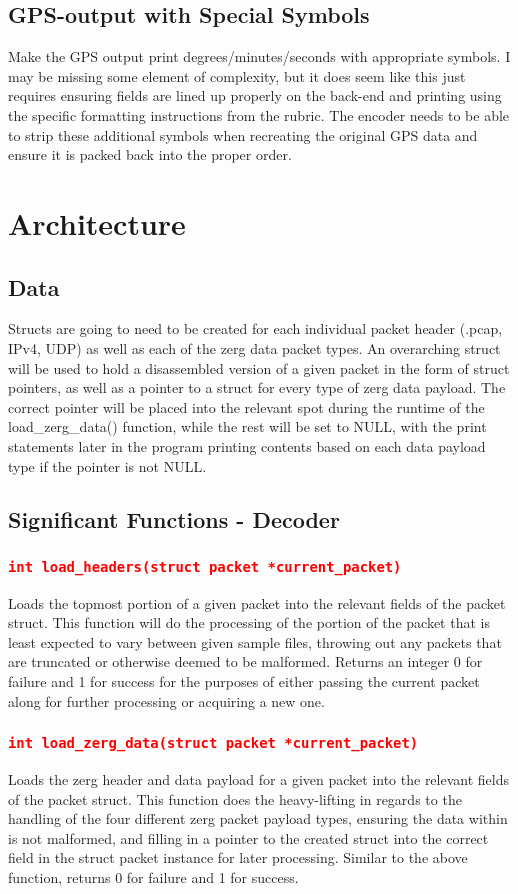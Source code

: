 \documentclass[11pt]{report}
\begin{document}
\subsection*{GPS-output with Special Symbols}
Make the GPS output print degrees/minutes/seconds with appropriate symbols. I may be missing some element of complexity, but it does seem like this just requires ensuring fields are lined up properly on the back-end and printing using the specific formatting instructions from the rubric. The encoder needs to be able to strip these additional symbols when recreating the original GPS data and ensure it is packed back into the proper order.
\pagebreak
\section*{Architecture}
\subsection*{Data}
Structs are going to need to be created for each individual packet header (.pcap, IPv4, UDP) as well as each of the zerg data packet types. An overarching struct will be used to hold a disassembled version of a given packet in the form of struct pointers, as well as a pointer to a struct for every type of zerg data payload. The correct pointer will be placed into the relevant spot during the runtime of the load\_zerg\_data() function, while the rest will be set to NULL, with the print statements later in the program printing contents based on each data payload type if the pointer is not NULL.
\pagebreak
\subsection*{Significant Functions - Decoder}
\subsubsection*{\texttt{\textcolor{red}{int load\_headers(struct packet *current\_packet)}}}
Loads the topmost portion of a given packet into the relevant fields of the packet struct. This function will do the processing of the portion of the packet that is least expected to vary between given sample files, throwing out any packets that are truncated or otherwise deemed to be malformed. Returns an integer 0 for failure and 1 for success for the purposes of either passing the current packet along for further processing or acquiring a new one.
\subsubsection*{\texttt{\textcolor{red}{int load\_zerg\_data(struct packet *current\_packet)}}}
Loads the zerg header and data payload for a given packet into the relevant fields of the packet struct. This function does the heavy-lifting in regards to the handling of the four different zerg packet payload types, ensuring the data within is not malformed, and filling in a pointer to the created struct into the correct field in the struct packet instance for later processing. Similar to the above function, returns 0 for failure and 1 for success.
\end{document}
